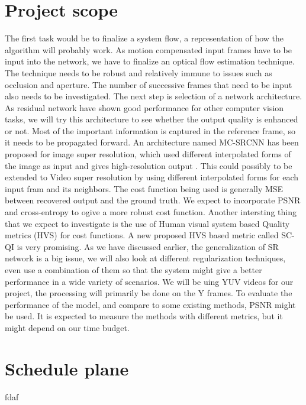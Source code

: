 \documentclass[10pt]{article}
\begin{document}
\section{Project scope} %
\label{sec:project_scope}
The first task would be to finalize a system flow, a representation of how the algorithm will probably work. As motion compensated input frames have to be input into the network, we have to finalize an optical flow estimation technique. The technique needs to be robust and relatively immune to issues such as occlusion and aperture. The number of successive frames that need to be input also needs to be investigated. The next step is selection of a network architecture. As residual network have shown good performance for other computer vision tasks, we will try this architecture to see whether the output quality is enhanced or not. Most of the important information is captured in the reference frame, so it needs to be propagated forward. An architecture named MC-SRCNN has been proposed for image super resolution, which used different interpolated forms of the image as input and gives high-resolution output \cite{youm2016image}. This could possibly to be extended to Video super resolution by using different interpolated forms for each input fram and its neighbors. The cost function being used is generally MSE between recovered output and the ground truth. We expect to incorporate PSNR and cross-entropy to ogive a more robust cost function. Another intersting thing that we expect to investigate is the use of Human visual system based Quality metrics (HVS) for cost functions. A new proposed HVS based metric called SC-QI \cite{bae2016novel} is very promising. As we have discussed earlier, the generalization of SR network is a big issue, we will also look at different regularization techniques, even use a combination of them so that the system might give a better performance in a wide variety of scenarios. We will be uing YUV videos for our project, the processing will primarily be done on the Y frames. To evaluate the performance of the model, and compare to some existing methods, PSNR might be used. It is expected to measure the methods with different metrics, but it might depend on our time budget. 

\section{Schedule plane} %
\label{sec:schedule_plane}
fdaf
\end{document}
